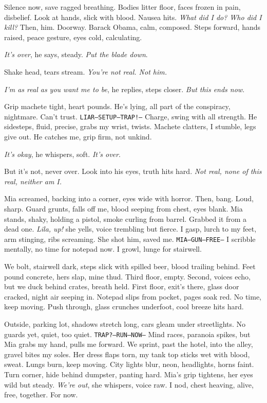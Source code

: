 \documentclass[12pt,oneside]{book} %
\newcommand{\note}[1]{\texttt{#1}}
\begin{document}
Silence now, save ragged breathing. Bodies litter floor, faces frozen in pain, disbelief. Look at hands, slick with blood. Nausea hits. \textit{What did I do? Who did I kill?} Then, him. Doorway. \textnormal{Barack Obama}, calm, composed. Steps forward, hands raised, peace gesture, eyes cold, calculating.

\textit{It’s over}, he says, steady. \textit{Put the blade down}.

Shake head, tears stream. \textit{You’re not real. Not him.}

\textit{I’m as real as you want me to be}, he replies, steps closer. \textit{But this ends now}.

Grip machete tight, heart pounds. He’s lying, all part of the conspiracy, nightmare. Can’t trust. \note{LIAR—SETUP—TRAP!—} Charge, swing with all strength. He sidesteps, fluid, precise, grabs my wrist, twists. Machete clatters, I stumble, legs give out. He catches me, grip firm, not unkind.

\textit{It’s okay}, he whispers, soft. \textit{It’s over}.

But it’s not, never over. Look into his eyes, truth hits hard. \textit{Not real, none of this real, neither am I.}

Mia screamed, backing into a corner, eyes wide with horror. Then, bang. Loud, sharp. Guard grunts, falls off me, blood seeping from chest, eyes blank. Mia stands, shaky, holding a pistol, smoke curling from barrel. Grabbed it from a dead one. \textit{Lila, up!} she yells, voice trembling but fierce. I gasp, lurch to my feet, arm stinging, ribs screaming. She shot him, saved me. \note{MIA—GUN—FREE—} I scribble mentally, no time for notepad now. I growl, lunge for stairwell.

We bolt, stairwell dark, steps slick with spilled beer, blood trailing behind. Feet pound concrete, hers slap, mine thud. Third floor, empty. Second, voices echo, but we duck behind crates, breath held. First floor, exit’s there, glass door cracked, night air seeping in. Notepad slips from pocket, pages soak red. No time, keep moving. Push through, glass crunches underfoot, cool breeze hits hard.

Outside, parking lot, shadows stretch long, cars gleam under streetlights. No guards yet, quiet, too quiet. \note{TRAP?—RUN—NOW—} Mind races, paranoia spikes, but Mia grabs my hand, pulls me forward. We sprint, past the hotel, into the alley, gravel bites my soles. Her dress flaps torn, my tank top sticks wet with blood, sweat. Lungs burn, keep moving. City lights blur, neon, headlights, horns faint. Turn corner, hide behind dumpster, panting hard. Mia’s grip tightens, her eyes wild but steady. \textit{We’re out}, she whispers, voice raw. I nod, chest heaving, alive, free, together. For now.
\end{document}
